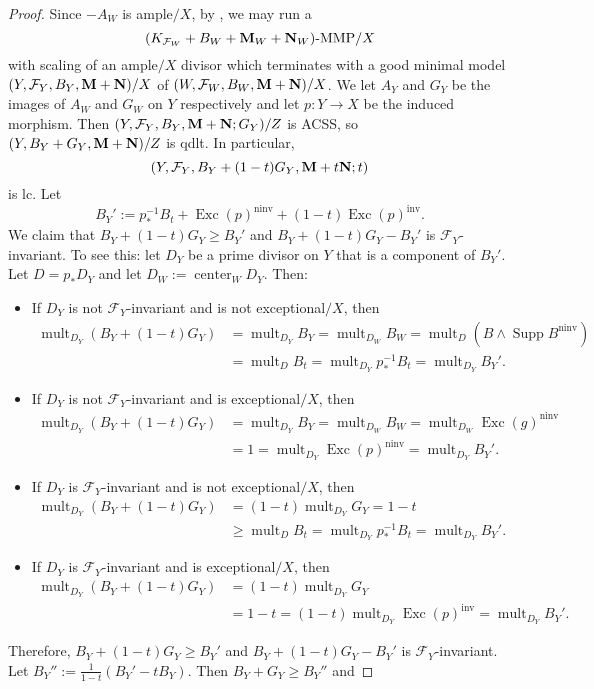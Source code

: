 \documentclass[12pt]{amsart}
\numberwithin{equation}{section}
\newcommand{\Mm}{{\bf{M}}}
\newcommand{\Nn}{{\bf{N}}}
\newcommand{\Center}{\operatorname{center}}
\newcommand{\Exc}{\operatorname{Exc}}
\newcommand{\ninv}{\operatorname{ninv}}
\newcommand{\inv}{\operatorname{inv}}
\newcommand{\Supp}{\operatorname{Supp}}
\newcommand{\mult}{\operatorname{mult}}
\newcommand{\Ff}{\mathcal{F}}
\theoremstyle{definition}
\theoremstyle{definition}
\theoremstyle{definition}
\begin{document}
\begin{proof}
 Since $-A_W$ is ample$/X$, by \cite[Theoerm 16.1.4]{CHLX23}, we may run a 
$$(K_{\Ff_W}+B_W+\Mm_W+\Nn_W)\text{-MMP}/X$$
with scaling of an ample$/X$ divisor which terminates with a good minimal model $(Y,\Ff_Y,B_Y,\Mm+\Nn)/X$ of $(W,\Ff_W,B_W,\Mm+\Nn)/X$. We let $A_Y$ and $G_Y$ be the images of $A_W$ and $G_W$ on $Y$ respectively and let $p: Y\rightarrow X$ be the induced morphism. Then $(Y,\Ff_Y,B_Y,\Mm+\Nn;G_Y)/Z$ is ACSS, so $(Y,B_Y+G_Y,\Mm+\Nn)/Z$ is qdlt. In particular, 
$$(Y,\Ff_Y,B_Y+(1-t)G_Y,\Mm+t\Nn;t)$$ is lc. Let 
$$B_Y':=p^{-1}_*B_t+\Exc(p)^{\ninv}+(1-t)\Exc(p)^{\inv}.$$ We claim that  $B_Y+(1-t)G_Y\geq B_Y'$ and $B_Y+(1-t)G_Y-B_Y'$ is $\Ff_Y$-invariant. To see this: let $D_Y$ be a prime divisor on $Y$ that is a component of $B_Y'$. Let $D=p_*D_Y$ and let $D_W:=\Center_WD_Y$. Then:
\begin{itemize}
    \item If $D_Y$ 
    is not $\Ff_Y$-invariant and is not exceptional$/X$, then 
    \begin{align*}
\mult_{D_Y}(B_Y+(1-t)G_Y)&=\mult_{D_Y}B_Y=\mult_{D_W}B_W=\mult_D(B\wedge\Supp B^{\ninv})\\
    &=\mult_DB_t=\mult_{D_Y}p^{-1}_*B_t=\mult_{D_Y}B_Y'. 
    \end{align*}
    \item If $D_Y$ is not $\Ff_Y$-invariant and is exceptional$/X$, then 
    \begin{align*}
\mult_{D_Y}(B_Y+(1-t)G_Y)&=\mult_{D_Y}B_Y=\mult_{D_W}B_W=\mult_{D_W}\Exc(g)^{\ninv}\\
    &=1=\mult_{D_Y}\Exc(p)^{\ninv}=\mult_{D_Y}B_Y'. 
    \end{align*}
    \item If $D_Y$ is $\Ff_Y$-invariant and is not exceptional$/X$, then 
    \begin{align*}
\mult_{D_Y}(B_Y+(1-t)G_Y)&=(1-t)\mult_{D_Y}G_Y=1-t\\
    &\geq\mult_DB_t=\mult_{D_Y}p^{-1}_*B_t=\mult_{D_Y}B_Y'. 
    \end{align*}
    \item If $D_Y$ is $\Ff_Y$-invariant and is exceptional$/X$, then 
    \begin{align*}
\mult_{D_Y}(B_Y+(1-t)G_Y)&=(1-t)\mult_{D_Y}G_Y\\
&=1-t=(1-t)\mult_{D_Y}\Exc(p)^{\inv}=\mult_{D_Y}B_Y'. 
    \end{align*}
\end{itemize}
Therefore, $B_Y+(1-t)G_Y\geq B_Y'$ and $B_Y+(1-t)G_Y-B_Y'$ is $\Ff_Y$-invariant. Let $B_Y'':=\frac{1}{1-t}(B_Y'-tB_Y)$. Then $B_Y+G_Y\geq B_Y''$ and 

\end{proof}
\end{document}
